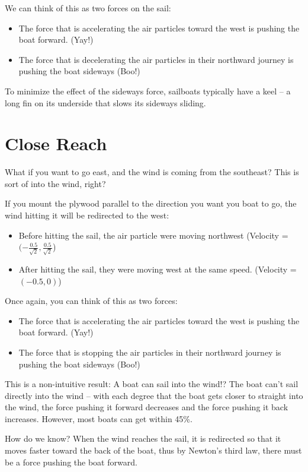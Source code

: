 We can think of this as two forces on the sail: 
\begin{itemize}
\item The force that is accelerating the air particles toward the west is pushing the boat forward.  (Yay!)
\item The force that is decelerating the air particles in their northward journey is pushing the boat sideways (Boo!)
\end{itemize}

To minimize the effect of the sideways force,  sailboats typically have  a keel -- a long fin on its underside that slows its sideways sliding.

\section{Close Reach}

What if you want to go east,  and the wind is coming from the southeast?  This is sort of into the wind,  right?

If you mount the plywood parallel to the direction you want you boat to go,  the wind hitting it will be redirected to the west:

\begin{itemize}
\item Before hitting the sail,  the air particle were moving northwest (Velocity = $(-\frac{0.5}{\sqrt{2}}, \frac{0.5}{\sqrt{2}}$)
\item After hitting the sail,  they were moving west at the same speed.  (Velocity = $(-0.5,0)$)
\end{itemize}

Once again, you can think of this as two forces: 
\begin{itemize}
\item The force that is accelerating the air particles toward the west is pushing the boat forward.  (Yay!)
\item The force that is stopping the air particles in their northward journey is pushing the boat sideways (Boo!)
\end{itemize}

This is a non-intuitive result: A boat can sail into the wind!?  The boat can't sail directly into the wind -- with each degree that the boat gets closer
to straight into the wind,  the force pushing it forward decreases and the force pushing it back increases.   However,  most boats can get within 45\%.

How do we know?  When the wind reaches the sail,  it is redirected so that it moves faster toward the back of the boat,   thus by Newton's third law,  there must be a force pushing the boat forward.

